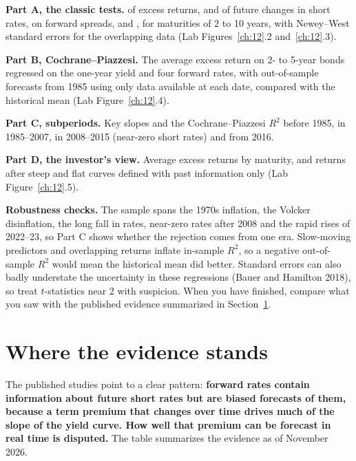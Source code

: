 \textbf{Part A, the classic tests.}  of excess returns, and of future changes in short rates, on forward spreads, and , for maturities of 2 to 10 years, with Newey--West standard errors for the overlapping data (Lab Figures~\ref{ch:12}.2 and~\ref{ch:12}.3).

\textbf{Part B, Cochrane--Piazzesi.} The average excess return on 2- to 5-year bonds regressed on the one-year yield and four forward rates, with out-of-sample forecasts from 1985 using only data available at each date, compared with the historical mean (Lab Figure~\ref{ch:12}.4).

\textbf{Part C, subperiods.} Key slopes and the Cochrane--Piazzesi $R^2$ before 1985, in 1985--2007, in 2008--2015 (near-zero short rates) and from 2016.

\textbf{Part D, the investor's view.} Average excess returns by maturity, and returns after steep and flat curves defined with past information only (Lab Figure~\ref{ch:12}.5).

\label{sec:07-stress}
\textbf{Robustness checks.} The sample spans the 1970s inflation, the Volcker disinflation, the long fall in rates, near-zero rates after 2008 and the rapid rises of 2022--23, so Part C shows whether the rejection comes from one era. Slow-moving predictors and overlapping returns inflate in-sample $R^2$, so a negative out-of-sample $R^2$ would mean the historical mean did better. Standard errors can also badly understate the uncertainty in these regressions (Bauer and Hamilton 2018), so treat $t$-statistics near 2 with suspicion. When you have finished, compare what you saw with the published evidence summarized in Section~\ref{sec:07-verdict}.

\section{Where the evidence stands}
\label{sec:07-verdict}

The published studies point to a clear pattern: \textbf{forward rates contain information about future short rates but are biased forecasts of them, because a term premium that changes over time drives much of the slope of the yield curve. How well that premium can be forecast in real time is disputed.} The table summarizes the evidence as of November 2026.


